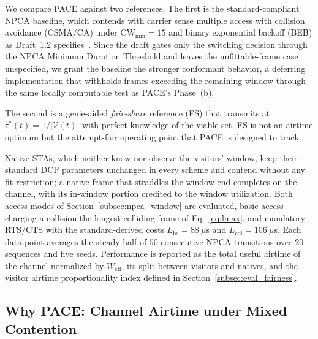 \documentclass[a4paper,fleqn]{cas-dc}
\newcommand{\Nvis}{N_\mathrm{vis}}
\begin{document}
We compare PACE against two references. The first is the standard-compliant NPCA baseline, which contends with carrier sense multiple access with collision avoidance (CSMA/CA) under $\mathrm{CW}_{\min}=15$ and binary exponential backoff (BEB) as Draft~1.2 specifies~\citep{ieee80211bn}. Since the draft gates only the switching decision through the NPCA Minimum Duration Threshold and leaves the unfittable-frame case unspecified, we grant the baseline the stronger conformant behavior, a deferring implementation that withholds frames exceeding the remaining window through the same locally computable test as PACE's Phase~(b).

The second is a genie-aided \emph{fair-share} reference (FS) that transmits at $\tau^*(t)=1/|\mathcal{V}(t)|$ with perfect knowledge of the viable set. FS is not an airtime optimum but the attempt-fair operating point that PACE is designed to track.

Native STAs, which neither know nor observe the visitors' window, keep their standard DCF parameters unchanged in every scheme and contend without any fit restriction; a native frame that straddles the window end completes on the channel, with its in-window portion credited to the window utilization. Both access modes of Section~\ref{subsec:npca_window} are evaluated, basic access charging a collision the longest colliding frame of Eq.~\eqref{eq:lmax}, and mandatory RTS/CTS with the standard-derived costs $L_\mathrm{hs}=88~\mu$s and $L_\mathrm{col}=106~\mu$s. Each data point averages the steady half of $50$ consecutive NPCA transitions over $20$ sequences and five seeds. Performance is reported as the total useful airtime of the channel normalized by $W_\mathrm{eff}$, its split between visitors and natives, and the visitor airtime proportionality index defined in Section~\ref{subsec:eval_fairness}.

\subsection{Why PACE: Channel Airtime under Mixed Contention}
\label{subsec:eval_whypace}
\end{document}
